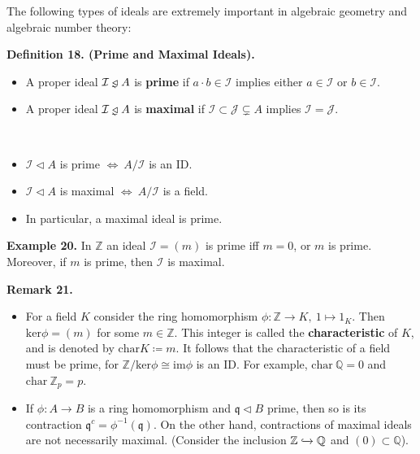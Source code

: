 \documentclass[12pt,a4paper,footinclude=true,headinclude=true]{scrbook} %
\newcommand{\trianglerightneq}{\mathrel{\ooalign{\raisebox{-0.5ex}{\reflectbox{\rotatebox{90}{$\nshortmid$}}}\cr$\triangleright$\cr}\mkern-3mu}}
\newcommand{\triangleleftneq}{\mathrel{\reflectbox{$\trianglerightneq$}}}
\newenvironment{lemma}[2][]
{\renewcommand\theinnercustomlemma{#2}\innercustomlemma[#1]
\begin{mdframed}[backgroundcolor=gray!20]\ }
{\end{mdframed}\endinnercustomprop}
\newenvironment{definition}[2][Definition]
    { \begin{mdframed}[backgroundcolor=gray!20] \textbf{#1 #2.}\ }
    {  \end{mdframed}}
\newenvironment{remark}[2][Remark]
    { \begin{mdframed}[backgroundcolor=gray!20] \textbf{#1 #2.} }
    {  \end{mdframed}}
\newenvironment{example}[2][Example]
    { \begin{mdframed}[backgroundcolor=gray!20] \textbf{#1 #2.} }
    {  \end{mdframed}}
\begin{document}
The following types of ideals are extremely important in algebraic geometry and algebraic number theory:
\begin{definition}{18. (Prime and Maximal Ideals)}
    \begin{itemize}
        \item A proper ideal $\mathcal{I}\triangleleftneq A$ is \textbf{prime} if $a\cdot b\in\mathcal{I}$ implies either $a\in\mathcal{I}$ or $b\in\mathcal{I}$.
        \item A proper ideal $\mathcal{I}\triangleleftneq A$ is \textbf{maximal} if $\mathcal{I}\subset\mathcal{J}\subsetneq A$ implies $\mathcal{I}=\mathcal{J}$.
    \end{itemize}
\end{definition}

\begin{lemma}{19}
    \begin{itemize}
        \item[(a)] $\mathcal{I}\triangleleft A$ is prime $\Leftrightarrow\ A/\mathcal{I}$ is an ID. 
        \item[(b)] $\mathcal{I}\triangleleft A$ is maximal $\Leftrightarrow\ A/\mathcal{I}$ is a field.
        \item[(c)] In particular, a maximal ideal is prime.
    \end{itemize}
\end{lemma}

\begin{example}{20}
    In $\mathbb{Z}$ an ideal $\mathcal{I}=(m)$ is prime iff $m=0$, or $m$ is prime. Moreover, if $m$ is prime, then $\mathcal{I}$ is maximal. 
\end{example}

\begin{remark}{21}
    \begin{itemize}
        \item[(a)] For a field $K$ consider the ring homomorphism $\phi:\mathbb{Z}\to K,\ 1\mapsto1_K$. Then $\mathrm{ker}\phi =(m)$ for some $m\in\mathbb{Z}$. This integer is called the \textbf{characteristic} of $K$, and is denoted by $\mathrm{char}K\coloneqq m$. It follows that the characteristic of a field must be prime, for $\mathbb{Z}/\mathrm{ker}\phi\cong\mathrm{im}\phi$ is an ID. For example, $\mathrm{char}\ \mathbb{Q}=0$ and $\mathrm{char}\  \mathbb{Z}_p=p$.
        \item[(b)] If $\phi:A\to B$ is a ring homomorphism and $\mathfrak{q}\triangleleft B$ prime, then so is its contraction $\mathfrak{q}^c=\phi^{-1}(\mathfrak{q})$. On the other hand, contractions of maximal ideals are not necessarily maximal. (Consider the inclusion $\mathbb{Z}\xhookrightarrow{} \mathbb{Q}$ and $(0)\subset \mathbb{Q}$).
    \end{itemize}
\end{remark}
\end{document}
